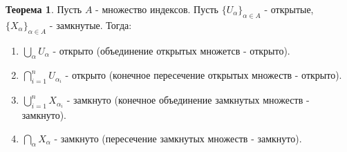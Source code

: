 \documentclass[a4paper, 12pt]{article}
\theoremstyle{definition}
\newtheorem*{theorem}{Теорема}
\begin{document}
        \begin{theorem}
            Пусть $A$ - множество индексов. Пусть $\{U_{\alpha}\}_{\alpha\in A}$ - открытые,\\
            $\{X_{\alpha}\}_{\alpha\in A}$ - замкнутые. Тогда:
            \begin{enumerate}
                \item $\bigcup\limits_{\alpha} U_{\alpha}$ - открыто (объединение открытых множетсв - открыто).
                \item $\bigcap\limits_{i=1}^n U_{\alpha_i}$ - открыто (конечное пересечение открытых множеств - открыто).
                \item $\bigcup\limits_{i=1}^n X_{\alpha_i}$ - замкнуто (конечное объединение замкнутых множеств - замкнуто).
                \item $\bigcap\limits_{\alpha} X_{\alpha}$ - замкнуто (пересечение замкнутых множеств - замкнуто).
            \end{enumerate}
        \end{theorem} 
\end{document}

